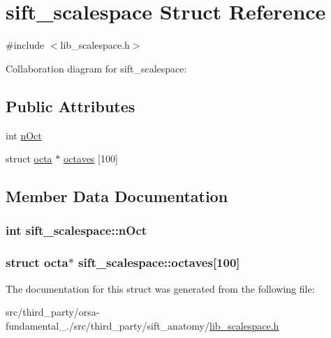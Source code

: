\hypertarget{structsift__scalespace}{}\section{sift\+\_\+scalespace Struct Reference}
\label{structsift__scalespace}


{\ttfamily \#include $<$lib\+\_\+scalespace.\+h$>$}



Collaboration diagram for sift\+\_\+scalespace\+:
\subsection*{Public Attributes}
\begin{DoxyCompactItemize}
\item 
int \hyperlink{structsift__scalespace_a57e616d1b3ba6b363351326519a60380}{n\+Oct}
\item 
struct \hyperlink{structocta}{octa} $\ast$ \hyperlink{structsift__scalespace_ae0eed05901e9cc41746d4c6a6cfba72b}{octaves} \mbox{[}100\mbox{]}
\end{DoxyCompactItemize}


\subsection{Member Data Documentation}
\hypertarget{structsift__scalespace_a57e616d1b3ba6b363351326519a60380}{}
\subsubsection[{n\+Oct}]{\setlength{\rightskip}{0pt plus 5cm}int sift\+\_\+scalespace\+::n\+Oct}\label{structsift__scalespace_a57e616d1b3ba6b363351326519a60380}
\hypertarget{structsift__scalespace_ae0eed05901e9cc41746d4c6a6cfba72b}{}
\subsubsection[{octaves}]{\setlength{\rightskip}{0pt plus 5cm}struct {\bf octa}$\ast$ sift\+\_\+scalespace\+::octaves\mbox{[}100\mbox{]}}\label{structsift__scalespace_ae0eed05901e9cc41746d4c6a6cfba72b}


The documentation for this struct was generated from the following file\+:\begin{DoxyCompactItemize}
\item 
src/third\+\_\+party/orsa-\/fundamental\+\_./src/third\+\_\+party/sift\+\_\+anatomy/\hyperlink{lib__scalespace_8h}{lib\+\_\+scalespace.\+h}\end{DoxyCompactItemize}
